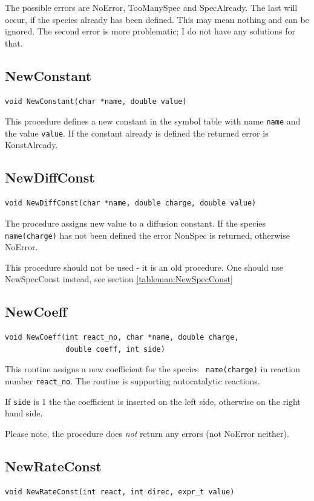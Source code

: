 The possible errors are NoError, TooManySpec and SpecAlready. The last
will occur, if the species already has been defined. This may mean 
nothing and can be ignored. The second error is more problematic; I
do not have any solutions for that.

\subsection{NewConstant}
\begin{verbatim}
void NewConstant(char *name, double value)
\end{verbatim}

This procedure defines a new constant in the symbol table with name 
{\tt name} and the value {\tt value}. If
the constant already is defined the returned error is KonstAlready.

\subsection{NewDiffConst}
\begin{verbatim}
void NewDiffConst(char *name, double charge, double value)
\end{verbatim}

The procedure assigns new value to a diffusion constant. If the species {\tt 
name(charge)} has not been defined the error NonSpec is returned,
otherwise NoError.

This procedure should not be used - it is an old procedure. One should
use NewSpecConst instead, see section \ref{tableman:NewSpecConst}

\subsection{NewCoeff}
\label{newcoeff}
\begin{verbatim}
void NewCoeff(int react_no, char *name, double charge, 
              double coeff, int side)
\end{verbatim}

This routine assigns a new coefficient for the species {\tt
  name(charge)} in reaction number {\tt react\_no}. The routine is 
supporting autocatalytic reactions. 

If {\tt side} is 1 the the coefficient is inserted on the left side,
otherwise on the right hand side.

Please note, the procedure does {\em not} return any errors 
(not NoError neither).

\subsection{NewRateConst}
\begin{verbatim}
void NewRateConst(int react, int direc, expr_t value)
\end{verbatim}


